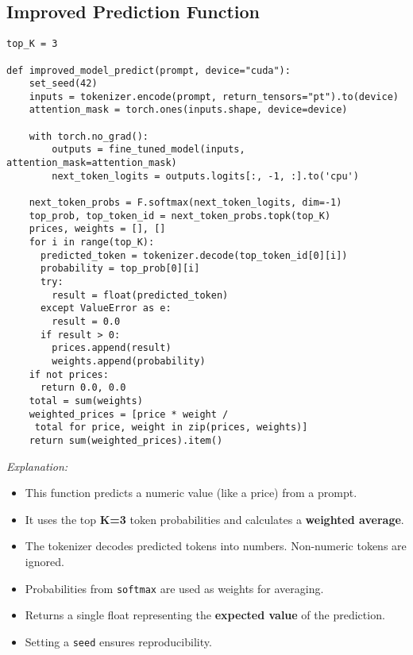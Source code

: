 \subsection{Improved Prediction Function}
\begin{tcolorbox}[colback=orange!5!white, colframe=orange!80!black, 
                  title=\textbf{Weighted Top-K Prediction}, 
                  coltitle=black, fonttitle=\bfseries, enhanced, sharp corners, boxrule=1pt]

\begin{verbatim}
top_K = 3

def improved_model_predict(prompt, device="cuda"):
    set_seed(42)
    inputs = tokenizer.encode(prompt, return_tensors="pt").to(device)
    attention_mask = torch.ones(inputs.shape, device=device)

    with torch.no_grad():
        outputs = fine_tuned_model(inputs, attention_mask=attention_mask)
        next_token_logits = outputs.logits[:, -1, :].to('cpu')

    next_token_probs = F.softmax(next_token_logits, dim=-1)
    top_prob, top_token_id = next_token_probs.topk(top_K)
    prices, weights = [], []
    for i in range(top_K):
      predicted_token = tokenizer.decode(top_token_id[0][i])
      probability = top_prob[0][i]
      try:
        result = float(predicted_token)
      except ValueError as e:
        result = 0.0
      if result > 0:
        prices.append(result)
        weights.append(probability)
    if not prices:
      return 0.0, 0.0
    total = sum(weights)
    weighted_prices = [price * weight /
     total for price, weight in zip(prices, weights)]
    return sum(weighted_prices).item()
\end{verbatim}

\textit{Explanation:} 
\begin{itemize}
    \item This function predicts a numeric value (like a price) from a prompt.
    \item It uses the top \textbf{K=3} token probabilities and calculates a \textbf{weighted average}.
    \item The tokenizer decodes predicted tokens into numbers. Non-numeric tokens are ignored.
    \item Probabilities from \texttt{softmax} are used as weights for averaging.
    \item Returns a single float representing the \textbf{expected value} of the prediction.
    \item Setting a \texttt{seed} ensures reproducibility.
\end{itemize}

\end{tcolorbox}

